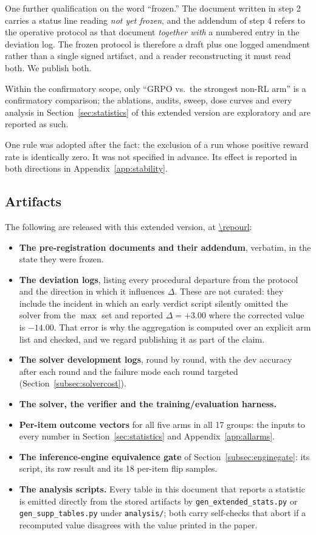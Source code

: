 One further qualification on the word ``frozen.'' The document written in step 2
carries a status line reading \emph{not yet frozen}, and the addendum of step 4
refers to the operative protocol as that document \emph{together with} a
numbered entry in the deviation log. The frozen protocol is therefore a draft
plus one logged amendment rather than a single signed artifact, and a reader
reconstructing it must read both. We publish both.

Within the confirmatory scope, only ``GRPO vs.\ the strongest non-RL arm'' is a
confirmatory comparison; the ablations, audits, sweep, dose curves and every
analysis in Section~\ref{sec:statistics} of this extended version are
exploratory and are reported as such.

One rule was adopted after the fact: the exclusion of a run whose positive
reward rate is identically zero. It was not specified in advance. Its effect is
reported in both directions in Appendix~\ref{app:stability}.

\subsection{Artifacts}

The following are released with this extended version, at
\url{\repourl}:

\begin{itemize}
\item \textbf{The pre-registration documents and their addendum}, verbatim, in
the state they were frozen.
\item \textbf{The deviation logs}, listing every procedural departure from the
protocol and the direction in which it influences $\Delta$. These are not
curated: they include the incident in which an early verdict script silently
omitted the solver from the $\max$ set and reported $\Delta = +3.00$ where the
corrected value is $-14.00$. That error is why the aggregation is computed over
an explicit arm list and checked, and we regard publishing it as part of the
claim.
\item \textbf{The solver development logs}, round by round, with the dev
accuracy after each round and the failure mode each round targeted
(Section~\ref{subsec:solvercost}).
\item \textbf{The solver, the verifier and the training/evaluation harness.}
\item \textbf{Per-item outcome vectors} for all five arms in all 17 groups: the
inputs to every number in Section~\ref{sec:statistics} and
Appendix~\ref{app:allarms}.
\item \textbf{The inference-engine equivalence gate} of
Section~\ref{subsec:enginegate}: its script, its raw result and its 18 per-item
flip samples.
\item \textbf{The analysis scripts.} Every table in this document that reports
a statistic is emitted directly from the stored artifacts by
\texttt{gen\_extended\_\allowbreak stats.py} or
\texttt{gen\_supp\_\allowbreak tables.py} under \texttt{analysis/}; both carry
self-checks that abort if a recomputed value disagrees with the value printed
in the paper.
\end{itemize}

